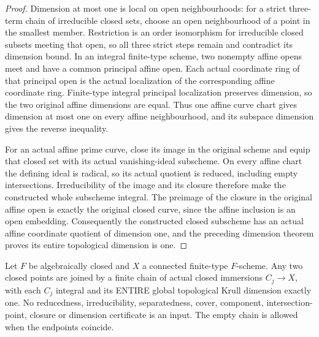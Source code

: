 \begin{proof}
Dimension at most one is local on open neighbourhoods: for a strict three-term chain of irreducible
closed sets, choose an open neighbourhood of a point in the smallest member. Restriction is an order
isomorphism for irreducible closed subsets meeting that open, so all three strict steps remain and
contradict its dimension bound. In an integral finite-type scheme, two nonempty affine opens meet and
have a common principal affine open. Each actual coordinate ring of that principal open is the actual
localization of the corresponding affine coordinate ring. Finite-type integral principal localization
preserves dimension, so the two original affine dimensions are equal. Thus one affine curve chart gives
dimension at most one on every affine neighbourhood, and its subspace dimension gives the reverse inequality.

For an actual affine prime curve, close its image in the original scheme and equip that closed set with
its actual vanishing-ideal subscheme. On every affine chart the defining ideal is radical, so its actual
quotient is reduced, including empty intersections. Irreducibility of the image and its closure therefore
make the constructed whole subscheme integral. The preimage of the closure in the original affine open is
exactly the original closed curve, since the affine inclusion is an open embedding. Consequently the
constructed closed subscheme has an actual affine coordinate quotient of dimension one, and the preceding
dimension theorem proves its entire topological dimension is one.
\end{proof}

\begin{lemma}\label{lem:fc-scheme-curve-chains}
\leanok
{}
Let $F$ be algebraically closed and $X$ a connected finite-type $F$-scheme. Any two closed points
are joined by a finite chain of actual closed immersions $C_j\to X$, with each $C_j$ integral and
its ENTIRE global topological Krull dimension exactly one. No reducedness, irreducibility,
separatedness, cover, component, intersection-point, closure or dimension certificate is an input.
The empty chain is allowed when the endpoints coincide.
\end{lemma}

